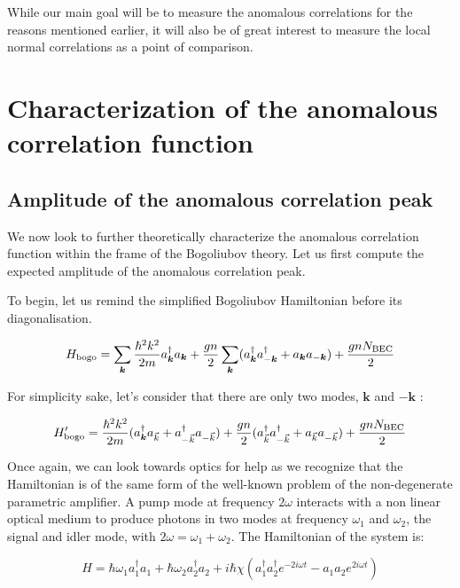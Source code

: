  While our main goal will be to measure the anomalous \kmk correlations for the reasons mentioned earlier, it will also be of great interest to measure the local normal correlations as a point of comparison. 

\section{Characterization of the anomalous correlation function}

\subsection{Amplitude of the anomalous correlation peak}

We now look to further theoretically characterize the anomalous correlation function within the frame of the Bogoliubov theory. Let us first compute the expected amplitude of the anomalous correlation peak.

To begin, let us remind the simplified Bogoliubov Hamiltonian before its diagonalisation.

\begin{equation}
    H_{\rm{bogo}}=\sum_{\bm{k}}\frac{\hbar^2 k^2}{2m} a^{\dagger}_{\bm{k}}  a_{\bm{k}} +  \frac{gn}{2} \sum_{\bm{k}} (a^{\dagger}_{\bm{k}} a^{\dagger}_{-\bm{k}} +a_{\bm{k}} a_{-\bm{k}})+\frac{gnN_{\rm{BEC}}}{2}
\end{equation}


For simplicity sake, let's consider that there are only two modes, $\bm{k}$ and $-\bm{k}$  : 

\begin{equation}
        H_{\rm{bogo}}'=\frac{\hbar^2 k^2}{2m} (a^{\dagger}_{\bm{k}}  a_{\vec{k}} + a^{\dagger}_{-\vec{k}}  a_{-\vec{k}}) +  \frac{gn}{2}  (a^{\dagger}_{\vec{k}} a^{\dagger}_{-\vec{k}} +a_{\vec{k}} a_{-\vec{k}})+\frac{gnN_{\rm{BEC}}}{2}
\end{equation}

Once again, we can look towards optics for help as we recognize that the Hamiltonian is of the same form of the well-known problem of the non-degenerate parametric amplifier. A pump mode at frequency $2 \omega$ interacts with a non linear optical medium to produce photons in two modes at frequency $\omega_1$ and $\omega_2$, the signal and idler mode, with $2 \omega = \omega_1 + \omega_2$. The Hamiltonian of the system is:

\begin{equation}
    H=\hbar \omega_1 a_1^{\dagger} a_1+ \hbar \omega_2 a_2^{\dagger} a_2 + i \hbar \chi (a_1^{\dagger}  a_2^{\dagger} e^{-2i\omega t} - a_1 a_2 e^{2i\omega t})
\end{equation}

